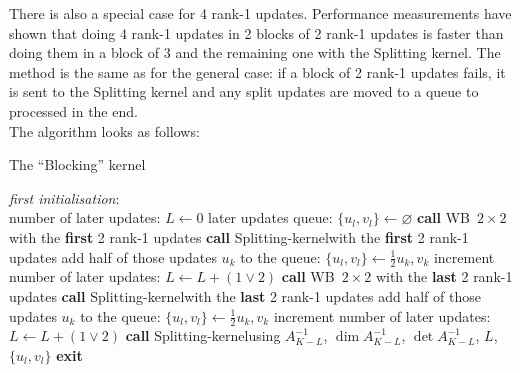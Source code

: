 \documentclass[11pt]{article}
\numberwithin{figure}{section}
\numberwithin{table}{section}
\begin{document}
      There is also a special case for 4 rank-1 updates. Performance measurements have shown that doing 4 rank-1 updates in 2 blocks of 2 rank-1 updates is faster than doing them in a block of 3 and the remaining one with the Splitting kernel. The method is the same as for the general case: if a block of 2 rank-1 updates fails, it is sent to the Splitting kernel and any split updates are moved to a queue to processed in the end.\\
    
      The algorithm looks as follows:\\
				
      \begin{algorithm}[h]
      	\caption{The ``Blocking'' kernel}\label{algo:blocking}
      	\textit{first initialisation}:\\
      	number of later updates: $L \gets 0$\;
      	later updates queue: $\{u_l, v_l\} \gets \varnothing$\;
      	 {
      		\textbf{call} WB~$2\times 2$ with the  \textbf{first} 2 rank-1 updates\;
      		 {
      			\textbf{call} Splitting-kernel\footnotemark[1] with the \textbf{first} 2 rank-1 updates\;
      			 {
      				add half of those updates $u_k$ to the queue: $\{u_l,v_l\} \gets \frac{1}{2}u_k, v_k$\;
      				increment number of later updates: $L \gets L + (1 \lor 2)$\;
      			}
      		}
      		\textbf{call} WB~$2\times 2$ with the \textbf{last} 2 rank-1 updates\;
      		 {
      			\textbf{call} Splitting-kernel\footnotemark[1] with the \textbf{last} 2 rank-1 updates\;
      			 {
      				add half of those updates $u_k$ to the queue: $\{u_l,v_l\} \gets \frac{1}{2}u_k, v_k$\;
      				increment number of later updates: $L \gets L + (1 \lor 2)$\;
      			}
      		}
      		{
      			\textbf{call} Splitting-kernel\footnotemark[2] using $A^{-1}_{K-L}$, $\dim A^{-1}_{K-L}$, $\det A^{-1}_{K-L} $, $L$, $\{u_l, v_l\}$\;
      		}
      		\textbf{exit}\;
      	}
      \end{algorithm}
\end{document}
